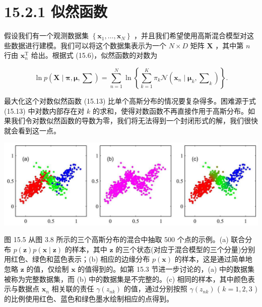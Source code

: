 \documentclass[10pt]{report}
\begin{document}
\section*{15.2.1 似然函数}

假设我们有一个观测数据集 \(\left\{  {{\mathbf{x}}_{1},\ldots ,{\mathbf{x}}_{N}}\right\}\) ，并且我们希望使用高斯混合模型对这些数据进行建模。我们可以将这个数据集表示为一个 \(N \times  D\) 矩阵 \(\mathbf{X}\) ，其中第 \(n\) 行由 \({\mathbf{x}}_{n}^{\mathrm{T}}\) 给出。根据式 (15.6)，似然函数的对数为

\[
\ln p\left( {\mathbf{X} \mid  \mathbf{\pi },\mathbf{\mu },\mathbf{\sum }}\right)  = \mathop{\sum }\limits_{{n = 1}}^{N}\ln \left\{  {\mathop{\sum }\limits_{{k = 1}}^{K}{\pi }_{k}\mathcal{N}\left( {{\mathbf{x}}_{n} \mid  {\mathbf{\mu }}_{k},{\mathbf{\sum }}_{k}}\right) }\right\}  . \tag{15.13}
\]

最大化这个对数似然函数 (15.13) 比单个高斯分布的情况要复杂得多。困难源于式 (15.13) 中对数内部存在对 \(k\) 的求和，使得对数函数不再直接作用于高斯分布。如果我们令对数似然函数的导数为零，我们将无法得到一个封闭形式的解，我们很快就会看到这一点。

\begin{center}
\includegraphics[max width=1.0\textwidth]{images/0194e279-9b28-703a-88f4-c3ac21e2010d_488_255_353_1290_422_0.jpg}
\end{center}
\hspace*{3em} 

图 15.5 从图 3.8 所示的三个高斯分布的混合中抽取 500 个点的示例。(a) 联合分布 \(p\left( \mathbf{z}\right) p\left( {\mathbf{x} \mid  \mathbf{z}}\right)\) 的样本，其中 \(\mathbf{z}\) 的三个状态(对应于混合模型的三个分量)分别用红色、绿色和蓝色表示；(b) 相应的边缘分布 \(p\left( \mathbf{x}\right)\) 的样本，这是通过简单地忽略 \(\mathbf{z}\) 的值，仅绘制 \(\mathbf{x}\) 的值得到的。如第 15.3 节进一步讨论的，(a) 中的数据集被称为完整数据集，而 (b) 中的数据集是不完整的。(c) 相同的样本，其中颜色表示与数据点 \({\mathbf{x}}_{n}\) 相关联的责任 \(\gamma \left( {z}_{nk}\right)\) 的值，通过分别按照 \(\gamma \left( {z}_{nk}\right)\) ( \(k = 1,2,3\) )的比例使用红色、蓝色和绿色墨水绘制相应的点得到。
\end{document}
